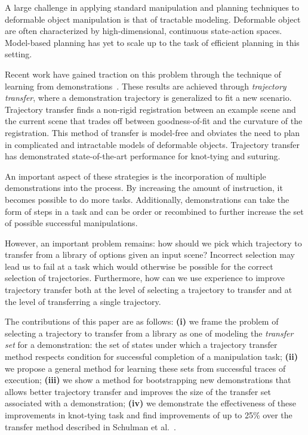 A large challenge in applying standard manipulation and planning techniques to
deformable object manipulation is that of tractable modeling. Deformable object 
are often characterized by high-dimensional, continuous state-action spaces. Model-based 
planning has yet to scale up to the task of efficient planning in this
setting.

Recent work have gained traction on this problem through the technique of 
learning from demonstrations~\cite{Schulmanetal_ISRR2013,Schulmanetal_IROS2013}.
These results are achieved through \emph{trajectory transfer}, where a demonstration
trajectory is generalized to fit a new scenario. Trajectory transfer finds a non-rigid
registration between an example scene and the current scene that trades off between
goodness-of-fit and the curvature of the registration. 
This method of transfer is model-free and obviates the need to plan in complicated
and intractable models of deformable objects. Trajectory transfer has demonstrated 
state-of-the-art performance for knot-tying and suturing.

An important aspect of these strategies is the incorporation of multiple demonstrations
into the process. By increasing the amount of instruction, it becomes possible to do more
tasks. Additionally, demonstrations can take the form of steps in a task and can be
order or recombined to further increase the set of possible successful manipulations.

However, an important problem remains: how should we pick which trajectory to transfer
from a library of options given an input scene? Incorrect selection may lead us
to fail at a task which would otherwise be possible for the correct selection of 
trajectories. Furthermore, how can we use experience to improve trajectory transfer 
both at the level of selecting a trajectory to transfer and at the level of transferring
a single trajectory.

The contributions of this paper are as follows: {\bf(i)} we frame the problem of selecting 
a trajectory to transfer from a library as one of modeling the \emph{transfer set} for a 
demonstration: the set of states under which a trajectory transfer method respects 
condition for successful completion of a manipulation task; {\bf(ii)} 
we propose a general method for learning these sets from successful traces of 
execution; {\bf(iii)} we show a method for bootstrapping new demonstrations
that allows better trajectory transfer and improves the size of the transfer set 
associated with a demonstration; {\bf(iv)} we demonstrate
the effectiveness of these improvements in knot-tying task and find improvements  
of up to 25\% over the transfer method described in Schulman et al.~\cite{Schulmanetal_ISRR2013}.



